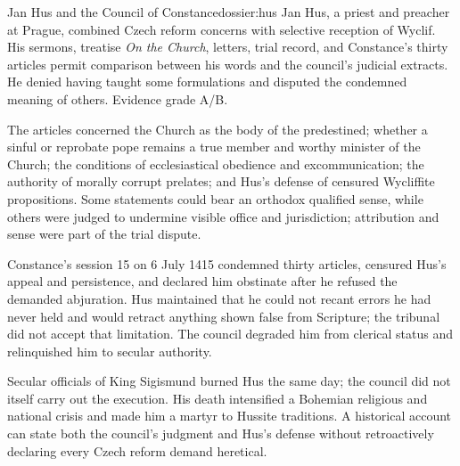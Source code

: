 \begin{heresydossier}{Jan Hus and the Council of Constance}{dossier:hus}
\objectfield Jan Hus, a priest and preacher at Prague, combined Czech reform concerns with selective reception of Wyclif. His sermons, treatise \emph{On the Church}, letters, trial record, and Constance's thirty articles permit comparison between his words and the council's judicial extracts. He denied having taught some formulations and disputed the condemned meaning of others. Evidence grade A/B.

\propositionfield The articles concerned the Church as the body of the predestined; whether a sinful or reprobate pope remains a true member and worthy minister of the Church; the conditions of ecclesiastical obedience and excommunication; the authority of morally corrupt prelates; and Hus's defense of censured Wycliffite propositions. Some statements could bear an orthodox qualified sense, while others were judged to undermine visible office and jurisdiction; attribution and sense were part of the trial dispute.

\responsefield Constance's session 15 on 6 July 1415 condemned thirty articles, censured Hus's appeal and persistence, and declared him obstinate after he refused the demanded abjuration. Hus maintained that he could not recant errors he had never held and would retract anything shown false from Scripture; the tribunal did not accept that limitation. The council degraded him from clerical status and relinquished him to secular authority.

\aftermathfield Secular officials of King Sigismund burned Hus the same day; the council did not itself carry out the execution. His death intensified a Bohemian religious and national crisis and made him a martyr to Hussite traditions. A historical account can state both the council's judgment and Hus's defense without retroactively declaring every Czech reform demand heretical.
\end{heresydossier}

